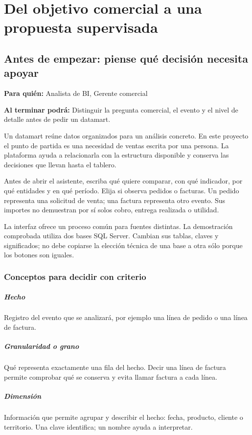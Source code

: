 \chapter{Del objetivo comercial a una propuesta supervisada}
\section{Antes de empezar: piense qué decisión necesita apoyar}
\label{unidad:BI01}
\textbf{Para quién:} Analista de BI, Gerente comercial\par
\textbf{Al terminar podrá:} Distinguir la pregunta comercial, el evento y el nivel de detalle antes de pedir un datamart.

Un datamart reúne datos organizados para un análisis concreto. En este proyecto el punto de partida es una necesidad de ventas escrita por una persona. La plataforma ayuda a relacionarla con la estructura disponible y conserva las decisiones que llevan hasta el tablero.

Antes de abrir el asistente, escriba qué quiere comparar, con qué indicador, por qué entidades y en qué período. Elija si observa pedidos o facturas. Un pedido representa una solicitud de venta; una factura representa otro evento. Sus importes no demuestran por sí solos cobro, entrega realizada o utilidad.

La interfaz ofrece un proceso común para fuentes distintas. La demostración comprobada utiliza dos bases SQL Server. Cambian sus tablas, claves y significados; no debe copiarse la elección técnica de una base a otra sólo porque los botones son iguales.

\subsection{Conceptos para decidir con criterio}
\paragraph{Hecho} Registro del evento que se analizará, por ejemplo una línea de pedido o una línea de factura.

\paragraph{Granularidad o grano} Qué representa exactamente una fila del hecho. Decir una línea de factura permite comprobar qué se conserva y evita llamar factura a cada línea.

\paragraph{Dimensión} Información que permite agrupar y describir el hecho: fecha, producto, cliente o territorio. Una clave identifica; un nombre ayuda a interpretar.

